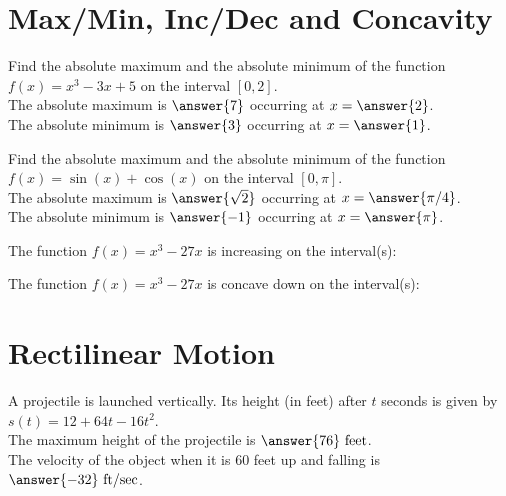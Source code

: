 \documentclass[handout]{ximera}
\begin{document}
\section{Max/Min, Inc/Dec and Concavity}

\begin{problem}
Find the absolute maximum and the absolute minimum of the function $f(x) = x^3 - 3x+ 5$
on the interval $[0, 2]$.\\
The absolute maximum is $\answer{7}$ occurring at $x = \answer{2}$.\\
The absolute minimum is $\answer{3}$ occurring at $x = \answer{1}$.\\
\end{problem}

\begin{problem}
Find the absolute maximum and the absolute minimum of the function $f(x) = \sin(x) + \cos(x)$
on the interval $[0, \pi]$.\\
The absolute maximum is $\answer{\sqrt 2}$ occurring at $x = \answer{\pi/4}$.\\
The absolute minimum is $\answer{-1}$ occurring at $x = \answer{\pi}$.
\end{problem}


\begin{problem}
The function $f(x) = x^3 - 27x$ is increasing on the interval(s):
\begin{multipleChoice}
\end{multipleChoice}
\end{problem}


\begin{problem}
The function $f(x) = x^3 - 27x$ is concave down on the interval(s):
\begin{multipleChoice}
\end{multipleChoice}
\end{problem}


\section{Rectilinear Motion}

\begin{problem}
A projectile is launched vertically.  Its height (in feet) after $t$ seconds is given by
$s(t) = 12 + 64t -16t^2$.\\

The maximum height of the projectile is $\answer{76} \ \text{feet}$.\\
The velocity of the object when it is $60$ feet up and falling is $\answer{-32} \ \text{ft/sec}$.
\end{problem}
\end{document}
